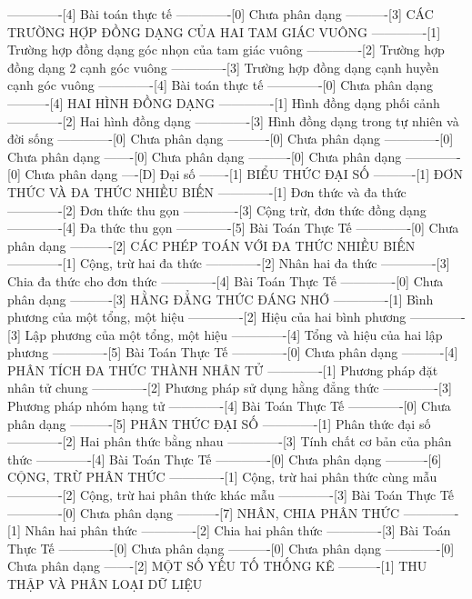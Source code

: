 -------------[4] Bài toán thực tế
-------------[0] Chưa phân dạng
----------[3] CÁC TRƯỜNG HỢP ĐỒNG DẠNG CỦA HAI TAM GIÁC VUÔNG
-------------[1] Trường hợp đồng dạng góc nhọn của tam giác vuông
-------------[2] Trường hợp đồng dạng 2 cạnh góc vuông
-------------[3] Trường hợp đồng dạng cạnh huyền cạnh góc vuông
-------------[4] Bài toán thực tế
-------------[0] Chưa phân dạng
----------[4] HAI HÌNH ĐỒNG DẠNG
-------------[1] Hình đồng dạng phối cảnh
-------------[2] Hai hình đồng dạng
-------------[3] Hình đồng dạng trong tự nhiên và đời sống
-------------[0] Chưa phân dạng
----------[0] Chưa phân dạng
-------------[0] Chưa phân dạng
-------[0] Chưa phân dạng
----------[0] Chưa phân dạng
-------------[0] Chưa phân dạng
----[D] Đại số
-------[1] BIỂU THỨC ĐẠI SỐ
----------[1] ĐƠN THỨC VÀ ĐA THỨC NHIỀU BIẾN
-------------[1] Đơn thức và đa thức
-------------[2] Đơn thức thu gọn
-------------[3] Cộng trừ, đơn thức đồng dạng
-------------[4] Đa thức thu gọn
-------------[5] Bài Toán Thực Tế
-------------[0] Chưa phân dạng
----------[2] CÁC PHÉP TOÁN VỚI ĐA THỨC NHIỀU BIẾN
-------------[1] Cộng, trừ hai đa thức
-------------[2] Nhân hai đa thức
-------------[3] Chia đa thức cho đơn thức
-------------[4] Bài Toán Thực Tế
-------------[0] Chưa phân dạng
----------[3] HẰNG ĐẲNG THỨC ĐÁNG NHỚ
-------------[1] Bình phương của một tổng, một hiệu
-------------[2] Hiệu của hai bình phương
-------------[3] Lập phương của một tổng, một hiệu
-------------[4] Tổng và hiệu của hai lập phương
-------------[5] Bài Toán Thực Tế
-------------[0] Chưa phân dạng
----------[4] PHÂN TÍCH ĐA THỨC THÀNH NHÂN TỬ
-------------[1] Phương pháp đặt nhân tử chung
-------------[2] Phương pháp sử dụng hằng đẳng thức
-------------[3] Phương pháp nhóm hạng tử
-------------[4] Bài Toán Thực Tế
-------------[0] Chưa phân dạng
----------[5] PHÂN THỨC ĐẠI SỐ
-------------[1] Phân thức đại số
-------------[2] Hai phân thức bằng nhau
-------------[3] Tính chất cơ bản của phân thức
-------------[4] Bài Toán Thực Tế
-------------[0] Chưa phân dạng
----------[6] CỘNG, TRỪ PHÂN THỨC
-------------[1] Cộng, trừ hai phân thức cùng mẫu
-------------[2] Cộng, trừ hai phân thức khác mẫu
-------------[3] Bài Toán Thực Tế
-------------[0] Chưa phân dạng
----------[7] NHÂN, CHIA PHÂN THỨC
-------------[1] Nhân hai phân thức
-------------[2] Chia hai phân thức
-------------[3] Bài Toán Thực Tế
-------------[0] Chưa phân dạng
----------[0] Chưa phân dạng
-------------[0] Chưa phân dạng
-------[2] MỘT SỐ YẾU TỐ THỐNG KÊ
----------[1] THU THẬP VÀ PHÂN LOẠI DỮ LIỆU
